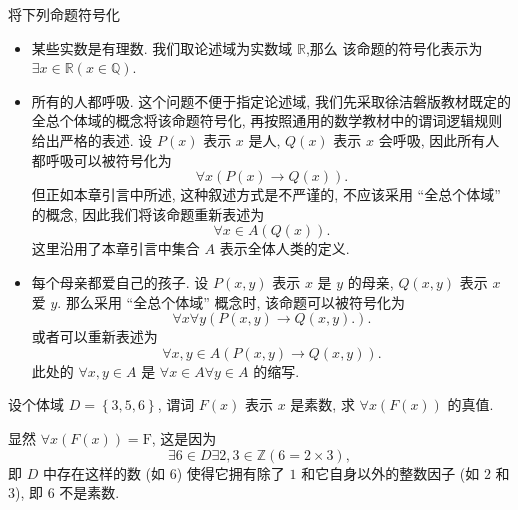 \documentclass[10pt,UTF8]{ctexbook} %
\begin{document}
\begin{exercise}
    将下列命题符号化
    \begin{itemize}[itemsep=0pt]
        \item {\kaishu 某些实数是有理数}. 我们取论述域为实数域 $\mathbb{R}$,那么
        该命题的符号化表示为 $\exists x \in \mathbb{R}\left( x \in \mathbb{Q} \right)$.
        \item {\kaishu 所有的人都呼吸}. 这个问题不便于指定论述域, 我们先采取徐洁磐版教材既定的
        全总个体域的概念将该命题符号化, 再按照通用的数学教材中的谓词逻辑规则给出严格的表述. 
        设 $P(x)$ 表示 $x$ 是人, $Q(x)$ 表示 $x$ 会呼吸, 因此所有人都呼吸可以被符号化为
        \[ \forall x \left( P(x) \to Q(x) \right). \]
        但正如本章引言中所述, 这种叙述方式是不严谨的, 不应该采用 “全总个体域” 的概念,
        因此我们将该命题重新表述为
        \[ \forall x \in A \left( Q(x) \right). \]
        这里沿用了本章引言中集合 $A$ 表示全体人类的定义.
        \item {\kaishu 每个母亲都爱自己的孩子}. 设 $P(x,y)$ 表示 $x$ 是 $y$ 的母亲,
        $Q(x,y)$ 表示 $x$ 爱 $y$. 那么采用 “全总个体域” 概念时, 该命题可以被符号化为
        \[ \forall x \forall y \left(
            P(x,y) \to Q(x,y).
        \right). \]
        或者可以重新表述为
        \[ \forall x,y \in A \left( P(x,y) \to Q(x,y) \right). \]
        此处的 $\forall x,y \in A$ 是 $\forall x \in A \forall y \in A$ 的缩写.
    \end{itemize}
\end{exercise}

\begin{exercise}
    设个体域 $D = \left\{3,5,6\right\}$, 谓词 $F(x)$ 表示 $x$ 是素数, 求
    $\forall x \left( F(x) \right)$ 的真值.
    \begin{sol}
        显然 $\forall x \left( F(x) \right) = \mathrm{F}$, 这是因为
        \[ \exists 6 \in D \exists 2,3 \in \mathbb{Z} \left(
            6 = 2 \times 3
        \right), \]
        即 {\kaishu $D$ 中存在这样的数 (如 $6$) 使得它拥有除了 $1$ 和它自身以外的整数因子 (如 $2$ 和 $3$),
        即 $6$ 不是素数}.
    \end{sol}
\end{exercise}
\end{document}

